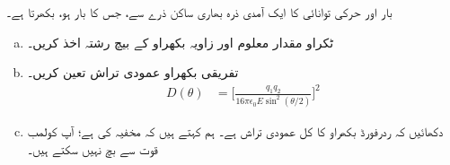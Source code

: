  بار  اور حرکی توانائی  کا ایک آمدی ذرہ بھاری ساکن ذرے سے، جس کا بار  ہو، بکھرتا ہے۔
\begin{enumerate}[a.]
\item
ٹکراو مقدار معلوم اور زاویہ بکھراو کے بیچ رشتہ اخذ کریں۔

 
\item
 تفریقی بکھراو عمودی تراش تعین کریں۔ 
\begin{align}\label{مساوات_بکھراو_تفریقی_بکھراو_عمودی_تراش}
D(\theta)&=\big[\frac{q_1q_2}{16\pi\epsilon_0E\sin^2(\theta/2)}\big]^2
\end{align}
\item
 دکھائیں کہ ردرفورڈ بکھراو کا کل عمودی تراش  ہے۔ ہم کہتے ہیں کہ  مخفیہ کی  ہے؛ آپ کولمب قوت سے بچ نہیں سکتے ہیں۔
 \end{enumerate}


